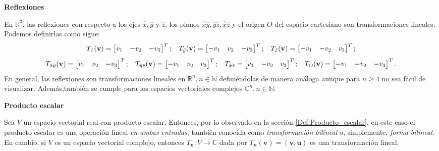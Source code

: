 \documentclass[12pt]{article}
\begin{document}
\textbf{Reflexiones} 

\vspace{2mm}
En $\mathbb{R}^3$, las reflexiones con respecto a los ejes $\hat{x},\hat{y}$ y $\hat{z}$, los planos $\hat{x}\hat{y}, \hat{y}\hat{z}, \hat{x}\hat{z}$ y el origen $O$ del espacio cartesiano son transformaciones lineales. Podemos definirlas como sigue: \[
    T_{\hat{x}}(\mathbf{v}) = \begin{bmatrix} v_1&-v_2&-v_3 \end{bmatrix}^T; \hspace{3mm} T_{\hat{y}}(\mathbf{v})=\begin{bmatrix} -v_1&v_2&-v_3 \end{bmatrix}^T; \hspace{3mm} T_{\hat{z}}(\mathbf{v}) = \begin{bmatrix} -v_1 & -v_2 & v_3 \end{bmatrix}^T
    ;\]\[ T_{\hat{x}\hat{y}}(\mathbf{v})=\begin{bmatrix} v_1&v_2&-v_3 \end{bmatrix}^T; \hspace{3mm}  T_{\hat{y}\hat{z}}(\mathbf{v}) = \begin{bmatrix} -v_1&v_2&v_3 \end{bmatrix}^T; \hspace{3mm} T_{\hat{x}\hat{z}} = \begin{bmatrix} v_1&-v_2&v_3 \end{bmatrix}^T; \hspace{3mm}  T_O(\mathbf{v})=\begin{bmatrix} -v_1&-v_2&-v_3 \end{bmatrix}^T 
.\] \noindent En general, las reflexiones son transformaciones lineales en $\mathbb{R}^n, n\in\mathbb{N}$ definiéndolas de manera análoga \textemdash aunque para $n\ge 4$ no sea fácil de visualizar. Además,también se cumple para los espacios vectoriales complejos $\mathbb{C}^n, n\in\mathbb{N}.$ 

\vspace{3mm}
\textbf{Producto escalar} 

\vspace{2mm}
Sea $V$ un espacio vectorial real con producto escalar. Entonces, por lo observado en la sección \ref{Def:Producto_escalar}, en este caso el producto escalar es una operación lineal \emph{en ambas entradas}, también conocida como \emph{transformación bilineal} o, simplemente, \emph{forma bilineal}. En cambio, si $V$ es un espacio vectorial complejo, entonces $T_{\mathbf{u}}:V\to \mathbb{C}$ dada por $T_{\mathbf{u}}(\mathbf{v})=(\mathbf{v},\mathbf{u})$ es una transformación lineal.
\end{document}
